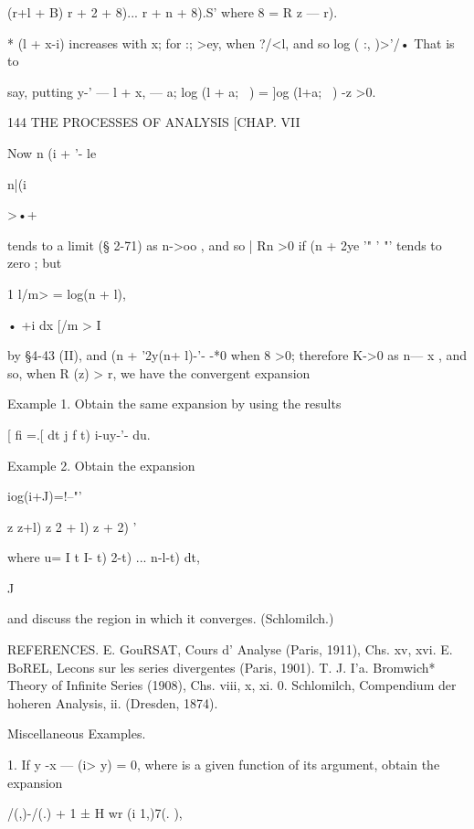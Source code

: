 {{(r+l + B) r + 2 + 8)... r + n + 8).S' 
where 8 = R z — r). 

* (l + x-i)  increases with x; for :; >ey, when ?/<l, and so log ( :, )>'/• That is to 

say, putting y-'  — l + x, — a; log (l + a;~ ) = ]og (l+a;~ ) -z >0. 



144 THE PROCESSES OF ANALYSIS [CHAP. VII 



Now n (i + '- le 



n|(i 



>•+  



tends to a limit (§ 2-71) as n->oo , and so | Rn >0 if (n + 2ye  '"  ' "' tends 
to zero ; but 

1 l/m>   = log(n + l), 



• +i dx 
[/m > I 

by §4-43 (II), and (n + '2y(n+ l)-'- -*0 when 8 >0; therefore K->0 as 
n— x , and so, when R (z) > r, we have the convergent expansion 



Example 1. Obtain the same expansion by using the results 



[ fi =.[ dt j f t) i-uy-'- du. 



Example 2. Obtain the expansion 



iog(i+J)=!--"' 



z z+l) z 2 + l) z + 2) ' 

where  u= I t  I- t)  2-t) ... n-l-t) dt, 

J 

and discuss the region in which it converges. (Schlomilch.) 

REFERENCES. 
E. GouRSAT, Cours d' Analyse (Paris, 1911), Chs. xv, xvi. 
E. BoREL, Lecons sur les series divergentes (Paris, 1901). 
T. J. I'a. Bromwich* Theory of Infinite Series (1908), Chs. viii, x, xi. 
0. Schlomilch, Compendium der hoheren Analysis, ii. (Dresden, 1874). 

Miscellaneous Examples. 

1. If y -x — (i> y) = 0, where is a given function of its argument, obtain the 
expansion 

/(,)-/(.) + 1 ± H wr (i  1,)7(. ), 

}}
